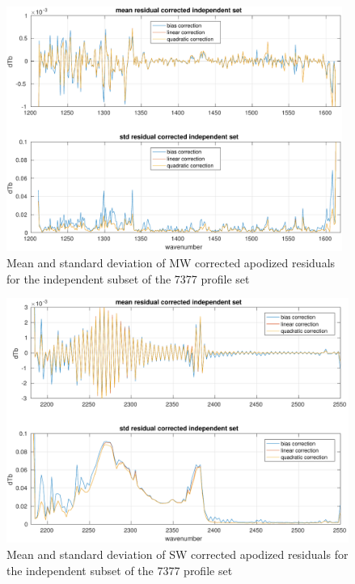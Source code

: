 \documentclass[12pt]{article}
\begin{document}
\begin{figure} %
  \centering
  \includegraphics[height=8cm]{figures/a2cris_stat_MW.pdf}
  \caption{Mean and standard deviation of MW corrected apodized
    residuals for the independent subset of the 7377 profile set}
  \label{statMW}
\end{figure}

\begin{figure} %
  \centering
  \includegraphics[height=8cm]{figures/a2cris_stat_SW.pdf}
  \caption{Mean and standard deviation of SW corrected apodized
    residuals for the independent subset of the 7377 profile set}
  \label{statSW}
\end{figure}

\FloatBarrier


\end{document}
